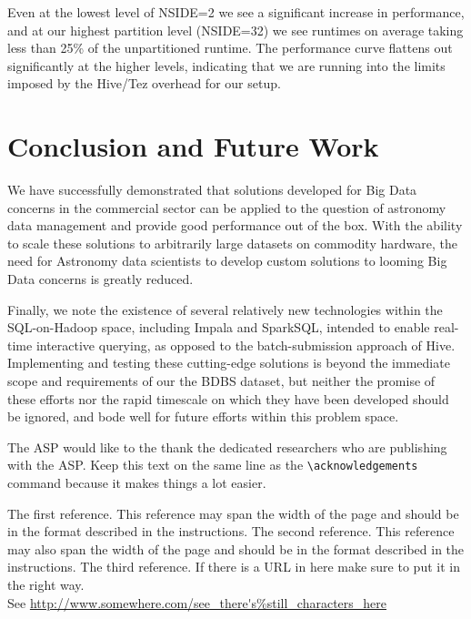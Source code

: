 \documentclass[11pt,twoside]{article}
\begin{document}


Even at the lowest level of NSIDE=2 we see a significant increase in performance, and at our highest partition level (NSIDE=32) we see runtimes on average taking less than 25\% of the unpartitioned runtime.  The performance curve flattens out significantly at the higher levels, indicating that we are running into the limits imposed by the Hive/Tez overhead for our setup. 

\section{Conclusion and Future Work}

We have successfully demonstrated that solutions developed for Big Data concerns in the commercial sector can be applied to the question of astronomy data management and provide good performance out of the box.  With the ability to scale these solutions to arbitrarily large datasets on commodity hardware, the need for Astronomy data scientists to develop custom solutions to looming Big Data concerns is greatly reduced.

Finally, we note the existence of several relatively new technologies within the SQL-on-Hadoop space, including Impala and SparkSQL, intended to enable real-time interactive querying, as opposed to the batch-submission approach of Hive.  Implementing and testing these cutting-edge solutions is beyond the immediate scope and requirements of our the BDBS dataset, but neither the promise of these efforts nor the rapid timescale on which they have been developed should be ignored, and bode well for future efforts within this problem space.  

\acknowledgements The ASP would like to the thank the dedicated researchers who are publishing with the ASP.  Keep this text on the same line as the \verb"\acknowledgements" command because it makes things a lot easier.


\begin{thebibliography}{}
The first reference.  This reference may span the width of the page and should be in the format described in the instructions.
The second reference.  This reference may also span the width of the page and should be in the format described in the instructions.
The third reference.  If there is a URL in here make sure to put it in the right way.\\
See {\footnotesize \url{http://www.somewhere.com/see_there's%still_characters_here}}
\end{thebibliography}
\end{document}
